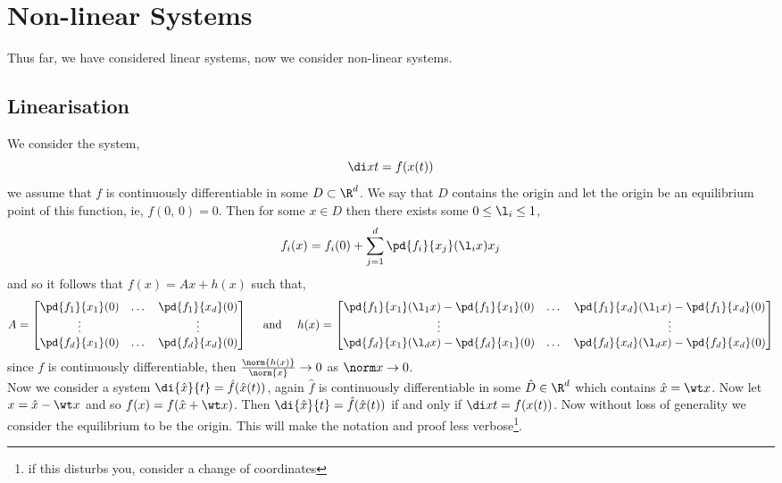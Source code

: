 
\section{Non-linear Systems}
Thus far, we have considered linear systems, now we consider non-linear systems.

\subsection{Linearisation}
We consider the system,
$$ \di x t = f(x(t)) $$
we assume that $f$ is continuously differentiable in some $D \subset \R^d$. We say that $D$ contains the origin and let the origin be an equilibrium point of this function, ie, $f(0,\,0)=0$. Then for some $x \in D$ then there exists some $0 \le \l_i \le 1$,
$$ f_i(x) = f_i(0) + \sum_{j=1}^d \pd{f_i}{x_j}(\l_ix)x_j  $$
and so it follows that $f(x) = Ax + h(x)$ such that,
$$ A = \begin{bmatrix}
  \pd{f_1}{x_1}(0) & \dots & \pd{f_1}{x_d}(0) \\
  \vdots && \vdots \\
  \pd{f_d}{x_1}(0) & \dots & \pd{f_d}{x_d}(0)
\end{bmatrix} \quad \text{ and } \quad h(x) = \begin{bmatrix}
  \pd{f_1}{x_1}(\l_1x) - \pd{f_1}{x_1}(0) & \dots & \pd{f_1}{x_d}(\l_1x) - \pd{f_1}{x_d}(0) \\
  \vdots && \vdots \\
  \pd{f_d}{x_1}(\l_d x) - \pd{f_d}{x_1}(0) & \dots & \pd{f_d}{x_d}(\l_dx) - \pd{f_d}{x_d}(0)
\end{bmatrix} $$
since $f$ is continuously differentiable, then $\frac{\norm{h(x)}}{\norm{x}} \to 0$ as $\norm x \to 0$.\\

Now we consider a system $\di{\hat x}{t} = \hat f(\hat x (t))$, again $\hat f$ is continuously differentiable in some $\hat D \in \R^d$ which contains $\hat x = \wt x$. Now let $x = \hat x - \wt x$ and so $f(x) = f(\hat x + \wt x)$. Then $\di{\hat x}{t} = \hat f(\hat x (t))$ if and only if $\di x t = f(x(t))$. Now without loss of generality we consider the equilibrium to be the origin. This will make the notation and proof less verbose\footnote{if this disturbs you, consider a change of coordinates}.\\


